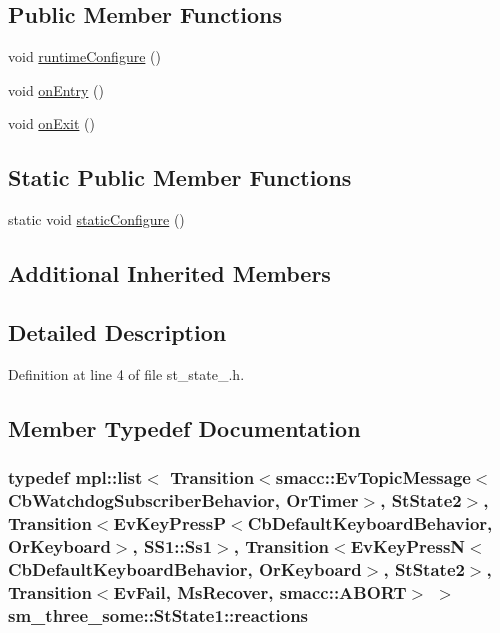 \subsection*{Public Member Functions}
\begin{DoxyCompactItemize}
\item 
void \hyperlink{structsm__three__some_1_1StState1_a639f34c03fad8014a4e7f7e93d590f27}{runtime\+Configure} ()
\item 
void \hyperlink{structsm__three__some_1_1StState1_addcf92fec018b57c6740acdd4ad0c05e}{on\+Entry} ()
\item 
void \hyperlink{structsm__three__some_1_1StState1_ae8b81c81aaf4ed4e061b8b5b88c8954b}{on\+Exit} ()
\end{DoxyCompactItemize}
\subsection*{Static Public Member Functions}
\begin{DoxyCompactItemize}
\item 
static void \hyperlink{structsm__three__some_1_1StState1_a5e4e25f1cad9ec8be2d03e7d70aeaa88}{static\+Configure} ()
\end{DoxyCompactItemize}
\subsection*{Additional Inherited Members}


\subsection{Detailed Description}


Definition at line 4 of file st\+\_\+state\+\_.\+h.



\subsection{Member Typedef Documentation}
\subsubsection[{\texorpdfstring{reactions}{reactions}}]{\setlength{\rightskip}{0pt plus 5cm}typedef mpl\+::list$<$ Transition$<${\bf smacc\+::\+Ev\+Topic\+Message}$<${\bf Cb\+Watchdog\+Subscriber\+Behavior}, {\bf Or\+Timer}$>$, {\bf St\+State2}$>$, Transition$<$Ev\+Key\+PressP$<$Cb\+Default\+Keyboard\+Behavior, {\bf Or\+Keyboard}$>$, {\bf S\+S1\+::\+Ss1}$>$, Transition$<$Ev\+Key\+PressN$<$Cb\+Default\+Keyboard\+Behavior, {\bf Or\+Keyboard}$>$, {\bf St\+State2}$>$, Transition$<${\bf Ev\+Fail}, {\bf Ms\+Recover}, {\bf smacc\+::\+A\+B\+O\+RT}$>$ $>$ {\bf sm\+\_\+three\+\_\+some\+::\+St\+State1\+::reactions}}\hypertarget{structsm__three__some_1_1StState1_a8982c63408fe696dc24de5f8679decd6}{}\label{structsm__three__some_1_1StState1_a8982c63408fe696dc24de5f8679decd6}


